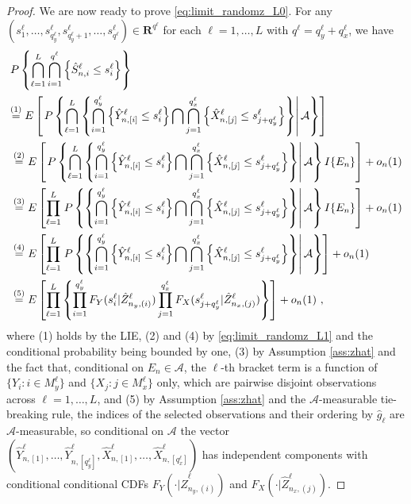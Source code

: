 \documentclass[11pt]{article}
\numberwithin{equation}{section}
\begin{document}
\begin{proof}
  We are now ready to prove \eqref{eq:limit_randomz_L0}. For any $(s_{1}^{\ell},\dots,s_{q_{y}^{\ell}}^{\ell},s_{q_{y}^{\ell}+1}^{\ell},\dots, s_{q^{\ell}}^{\ell})\in\mathbf{R}^{q^{\ell}}$ for each $\ell=1,\dots,L$ with $q^{\ell}=q_{y}^{\ell}+q_{x}^{\ell}$, we have
  \begin{align}
  &P\left\{\bigcap_{\ell=1}^{L}\bigcap_{i=1}^{q^{\ell}}\left\{\hat S_{n,i}^{\ell}\leq
  s_{i}^{\ell}\right\}\right\}\notag\\
  &{\overset{(1)}{=}E\left[\left.P\left\{\bigcap_{\ell=1}^{L}\left\{
  \bigcap_{i=1}^{q_{y}^{\ell}}\left\{\hat Y_{n,\left[i\right]}^{\ell}\leq s_{i}^{\ell}
  \right\}\bigcap\bigcap_{j=1}^{q_{x}^{\ell}}\left\{\hat X_{n,\left[j\right]}^{\ell}\leq
  s_{j+q_{y}^{\ell}}^{\ell}\right\}\right\}\right\vert\mathcal{A}\right\}\right]}\notag\\
  &\overset{(2)}{=}E\left[\left.P\left\{\bigcap_{\ell=1}^{L}\left\{
  \bigcap_{i=1}^{q_{y}^{\ell}}\left\{\hat Y_{n,\left[i\right]}^{\ell}\leq s_{i}^{\ell}
  \right\}\bigcap\bigcap_{j=1}^{q_{x}^{\ell}}\left\{\hat X_{n,\left[j\right]}^{\ell}\leq
  s_{j+q_{y}^{\ell}}^{\ell}\right\}\right\}\right\vert\mathcal{A}\right\}I\{E_{n}\}\right]
  +o_{n}(1)\notag\\
  &\overset{(3)}{=}E\left[\prod_{\ell=1}^{L}\left.P\left\{\left\{
  \bigcap_{i=1}^{q_{y}^{\ell}}\left\{\hat Y_{n,\left[i\right]}^{\ell}\leq s_{i}^{\ell}
  \right\}\bigcap\bigcap_{j=1}^{q_{x}^{\ell}}\left\{\hat X_{n,\left[j\right]}^{\ell}\leq
  s_{j+q_{y}^{\ell}}^{\ell}\right\}\right\}\right\vert\mathcal{A}\right\}I\{E_{n}\}\right]
  +o_{n}(1)\notag\\
  &\overset{(4)}{=}E\left[\prod_{\ell=1}^{L}\left.P\left\{\left\{
  \bigcap_{i=1}^{q_{y}^{\ell}}\left\{\hat Y_{n,\left[i\right]}^{\ell}\leq s_{i}^{\ell}
  \right\}\bigcap\bigcap_{j=1}^{q_{x}^{\ell}}\left\{\hat X_{n,\left[j\right]}^{\ell}\leq
  s_{j+q_{y}^{\ell}}^{\ell}\right\}\right\}\right\vert\mathcal{A}\right\}\right]
  +o_{n}(1)\notag\\
  &\overset{(5)}{=}E\left[\prod_{\ell=1}^{L}\left\{\prod_{i=1}^{q_{y}^{\ell}}
  F_{Y}(s_{i}^{\ell}|\hat Z_{n_{y},\left(i\right)}^{\ell})\prod_{j=1}^{q_{x}^{\ell}}
  F_{X}(s_{j+q_{y}^{\ell}}^{\ell}|\hat Z_{n_{x},\left(j\right)}^{\ell})\right\}\right]+o_{n}(1)~,
  \label{eq:limit_randomz_L5}
  \end{align}
where (1) holds by the LIE, (2) and (4) by \eqref{eq:limit_randomz_L1} and the conditional probability being bounded by one, (3) by Assumption \ref{ass:zhat} and the fact that, conditional on $E_n \in \mathcal{A}$, the $\ell$-th bracket term is a function of $\{Y_i:i\in M_y^{\ell}\}$ and $\{X_j:j\in M_x^{\ell}\}$ only, which are pairwise disjoint observations across $\ell = 1,\dots,L$, and (5) by Assumption \ref{ass:zhat} and the $\mathcal A$-measurable tie-breaking rule, the indices of the selected observations and their ordering by $\hat g_\ell$ are $\mathcal A$-measurable, so conditional on $\mathcal A$ the vector $(\hat Y_{n,[1]}^{\ell},\dots,\hat Y_{n,[q_y^\ell]}^{\ell}, \hat X_{n,[1]}^{\ell},\dots,\hat X_{n,[q_x^\ell]}^{\ell})$ has independent components with conditional conditional CDFs $F_{Y}(\cdot|\hat Z_{n_{y},(i)}^{\ell})$ and $F_{X}(\cdot|\hat Z_{n_{x},(j)}^{\ell})$.


\end{proof}
\end{document}
